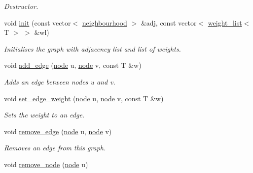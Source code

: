 \begin{DoxyCompactItemize}
\begin{DoxyCompactList}\small\item\em Destructor. \end{DoxyCompactList}\item 
void \hyperlink{classlgraph_1_1utils_1_1wugraph_ad091ebc111bef02914a8c58e7788ec6f}{init} (const vector$<$ \hyperlink{namespacelgraph_1_1utils_a0f2ef47028a466d26841709e705390ac}{neighbourhood} $>$ \&adj, const vector$<$ \hyperlink{namespacelgraph_1_1utils_a11e7963f3637ea13778b8d3e69d2c17f}{weight\-\_\-list}$<$ T $>$ $>$ \&wl)
\begin{DoxyCompactList}\small\item\em Initialises the graph with adjacency list and list of weights. \end{DoxyCompactList}\item 
void \hyperlink{classlgraph_1_1utils_1_1wugraph_a64d5de79fb869156ba3a110a68d6ea3f}{add\-\_\-edge} (\hyperlink{namespacelgraph_1_1utils_a7bd66ede3805ef121bc2835bd48de0cf}{node} u, \hyperlink{namespacelgraph_1_1utils_a7bd66ede3805ef121bc2835bd48de0cf}{node} v, const T \&w)
\begin{DoxyCompactList}\small\item\em Adds an edge between nodes {\itshape u} and {\itshape v}. \end{DoxyCompactList}\item 
void \hyperlink{classlgraph_1_1utils_1_1wugraph_aa0283f5f7deacb7940d2f707e65c6f81}{set\-\_\-edge\-\_\-weight} (\hyperlink{namespacelgraph_1_1utils_a7bd66ede3805ef121bc2835bd48de0cf}{node} u, \hyperlink{namespacelgraph_1_1utils_a7bd66ede3805ef121bc2835bd48de0cf}{node} v, const T \&w)
\begin{DoxyCompactList}\small\item\em Sets the weight to an edge. \end{DoxyCompactList}\item 
void \hyperlink{classlgraph_1_1utils_1_1wugraph_a8fd7f1a7ef76576a35e72687f4fdfce1}{remove\-\_\-edge} (\hyperlink{namespacelgraph_1_1utils_a7bd66ede3805ef121bc2835bd48de0cf}{node} u, \hyperlink{namespacelgraph_1_1utils_a7bd66ede3805ef121bc2835bd48de0cf}{node} v)
\begin{DoxyCompactList}\small\item\em Removes an edge from this graph. \end{DoxyCompactList}\item 
void \hyperlink{classlgraph_1_1utils_1_1wugraph_ac51b2eccbef7bd7dd28813ac55e7d993}{remove\-\_\-node} (\hyperlink{namespacelgraph_1_1utils_a7bd66ede3805ef121bc2835bd48de0cf}{node} u)

\end{DoxyCompactItemize}
